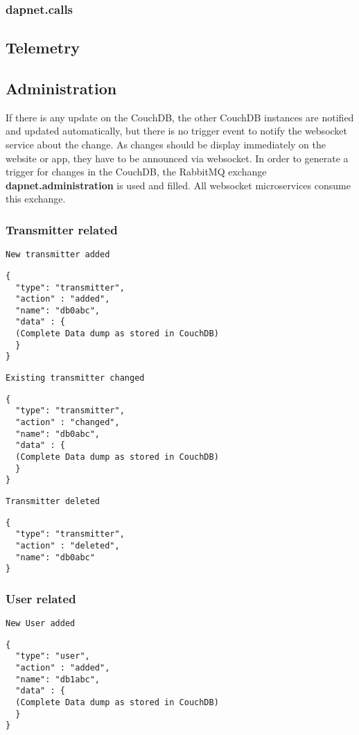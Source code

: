 \subsubsection{dapnet.calls}
\label{protocoldef:RabbitMQ:dapnet.local_calls}




\subsection{Telemetry}

\subsection{Administration}
\label{protocoldef:RabbitMQ:dapnet.administration}
If there is any update on the CouchDB, the other CouchDB instances are notified and updated automatically, but there is no trigger event to notify the websocket service about the change. As changes should be display immediately on the website or app, they have to be announced via websocket. In order to generate a trigger for changes in the CouchDB, the RabbitMQ exchange \textbf{dapnet.administration} is used and filled. All websocket microservices consume this exchange.


\subsubsection{Transmitter related}
\texttt{New transmitter added}
\begin{lstlisting}
{
  "type": "transmitter",
  "action" : "added",
  "name": "db0abc",
  "data" : {
  (Complete Data dump as stored in CouchDB)
  }
}
\end{lstlisting}

\texttt{Existing transmitter changed}
\begin{lstlisting}
{
  "type": "transmitter",
  "action" : "changed",
  "name": "db0abc",
  "data" : {
  (Complete Data dump as stored in CouchDB)
  }
}
\end{lstlisting}

\texttt{Transmitter deleted}
\begin{lstlisting}
{
  "type": "transmitter",
  "action" : "deleted",
  "name": "db0abc"
}
\end{lstlisting}

\subsubsection{User related}
\texttt{New User added}
\begin{lstlisting}
{
  "type": "user",
  "action" : "added",
  "name": "db1abc",
  "data" : {
  (Complete Data dump as stored in CouchDB)
  }
}
\end{lstlisting}

